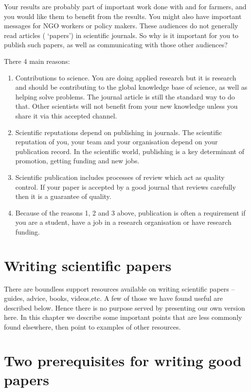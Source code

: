 \documentclass[
]{book}
\begin{document}
Your results are probably part of important work done with and for farmers, and you would like them to benefit from the results. You might also have important messages for NGO workers or policy makers. These audiences do not generally read articles ( `papers') in scientific journals. So why is it important for you to publish such papers, as well as communicating with those other audiences?

There 4 main reasons:

\begin{enumerate}
\def\labelenumi{\arabic{enumi}.}
\item
  Contributions to science. You are doing applied research but it is research and should be contributing to the global knowledge base of science, as well as helping solve problems. The journal article is still the standard way to do that. Other scientists will not benefit from your new knowledge unless you share it via this accepted channel.
\item
  Scientific reputations depend on publishing in journals. The scientific reputation of you, your team and your organisation depend on your publication record. In the scientific world, publishing is a key determinant of promotion, getting funding and new jobs.
\item
  Scientific publication includes processes of review which act as quality control. If your paper is accepted by a good journal that reviews carefully then it is a guarantee of quality.
\item
  Because of the reasons 1, 2 and 3 above, publication is often a requirement if you are a student, have a job in a research organisation or have research funding.
\end{enumerate}

\hypertarget{writing-scientific-papers}{%
\section{Writing scientific papers}\label{writing-scientific-papers}}

There are boundless support resources available on writing scientific papers -- guides, advice, books, videos,etc. A few of those we have found useful are described below. Hence there is no purpose served by presenting our own version here. In this chapter we describe some important points that are less commonly found elsewhere, then point to examples of other resources.

\hypertarget{two-prerequisites-for-writing-good-papers}{%
\section{Two prerequisites for writing good papers}\label{two-prerequisites-for-writing-good-papers}}
\end{document}
